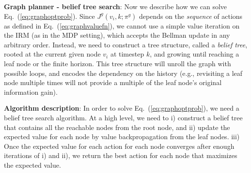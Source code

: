 \documentclass{article}
\newcommand{\ph}[1]{{\textbf{#1}:}} %
\newcommand{\note}[1]{{\color{cyan} NOTE: #1 }}
\begin{document}


\ph{Graph planner - belief tree search}
Now we describe how we can solve Eq.~(\ref{eq:graphoptprob}).
Since $J^g(v_i,k; \pi^g)$ depends on the \textit{sequence} of actions as defined in Eq.~(\ref{eq:graphvaluefn}), we cannot use a simple value iteration on the IRM (as in the MDP setting), which accepts the Bellman update in any arbitrary order.
Instead, we need to construct a tree structure, called a \textit{belief tree}, rooted at the current given node $v_i$ at timestep $k$, and growing until reaching a leaf node or the finite horizon.
%
This tree structure will unroll the graph with possible loops, and encodes the dependency on the history
(e.g., revisiting a leaf node multiple times will not provide a multiple of the leaf node's original information gain).


\ph{Algorithm description}
In order to solve Eq.~(\ref{eq:graphoptprob}), we need a belief tree search algorithm.
At a high level, we need to i) construct a belief tree that contains all the reachable nodes from the root node, and ii) update the expected value for each node by value backpropagation from the leaf nodes.
iii) Once the expected value for each action for each node converges after enough iterations of i) and ii), we return the best action for each node that maximizes the expected value.
\end{document}
